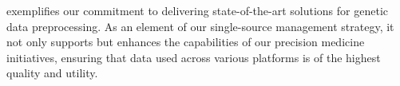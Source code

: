 
\dnasnake exemplifies our commitment to delivering state-of-the-art solutions for genetic data preprocessing. As an element of our single-source management strategy, it not only supports but enhances the capabilities of our precision medicine initiatives, ensuring that data used across various platforms is of the highest quality and utility.
